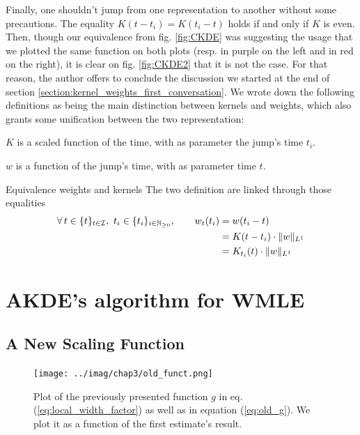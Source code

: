 \documentclass[11pt]{book}
\newcommand{\sequence}[1]{\{ #1 \}_{ i \in \N} }
\newcommand{\sequencetime}{\{t\}_{t \in \mathcal I} }
\begin{document}
\newpage 
Finally, one shouldn't jump from one representation to another without some precautions. The equality $K(t - t_i) = K(t_i - t)$ holds if and only if $K$ is even. Then, though our equivalence from fig. \ref{fig:CKDE} was suggesting the usage that we plotted the same function on both plots (resp. in purple on the left and in red on the right), it is clear on fig. \ref{fig:CKDE2} that it is not the case. For that reason, the author offers to conclude the discussion we started at the end of section \ref{section:kernel_weights_first_conversation}. We wrote down the following definitions as being the main distinction between kernels and weights, which also grants some unification between the two representation:
\begin{definition}[Kernel]
$K$ is a scaled function of the time, with as parameter the jump's time $t_i$.
\end{definition}

\begin{definition}
$w$ is a function of the jump's time, with as parameter time $t$.
\end{definition}

\begin{theoreme}[label = thrm:equiv_w_k]{Equivalence weights and kernels}
The two definition are linked through those equalities
\begin{align*}
\forall t \in \sequencetime, \ t_i \in \sequence{t_i }, \qquad w_t(t_i) 
&= w(t_i - t) \\
&=  K(t - t_i) \cdot \norm{w}_{L^1} \\
&= K_{t_i}(t) \cdot \norm{w}_{L^1}
\end{align*}
\end{theoreme}





\section{AKDE's algorithm for WMLE}
\subsection{A New Scaling Function}



\begin{figure}
\centering
\texttt{[image: ../imag/chap3/old\_funct.png]}
\caption{Plot of the previously presented function $g$ in eq. (\ref{eq:local_width_factor}) as well as in equation (\ref{eq:old_g}). We plot it as a function of the first estimate's result.}
\label{fig:old_scaling}
\end{figure}
\end{document}

